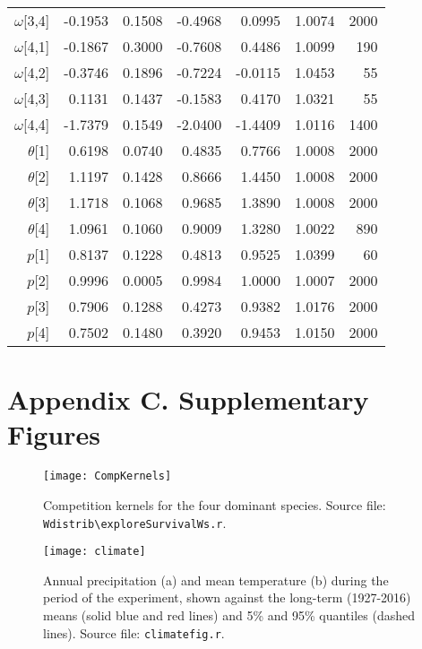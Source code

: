 \documentclass[11pt]{article}
\begin{document}
\begin{table}[ht]
\begin{tabular}{rrrrrrr}
  $\omega$[3,4] & -0.1953 & 0.1508 & -0.4968 & 0.0995 & 1.0074 &  2000 \\ 
  $\omega$[4,1] & -0.1867 & 0.3000 & -0.7608 & 0.4486 & 1.0099 &   190 \\ 
  $\omega$[4,2] & -0.3746 & 0.1896 & -0.7224 & -0.0115 & 1.0453 &    55 \\ 
  $\omega$[4,3] & 0.1131 & 0.1437 & -0.1583 & 0.4170 & 1.0321 &    55 \\ 
  $\omega$[4,4] & -1.7379 & 0.1549 & -2.0400 & -1.4409 & 1.0116 &  1400 \\ 
   $\theta$[1] & 0.6198 & 0.0740 & 0.4835 & 0.7766 & 1.0008 &  2000 \\ 
   $\theta$[2] & 1.1197 & 0.1428 & 0.8666 & 1.4450 & 1.0008 &  2000 \\ 
   $\theta$[3] & 1.1718 & 0.1068 & 0.9685 & 1.3890 & 1.0008 &  2000 \\ 
  $\theta$[4] & 1.0961 & 0.1060 & 0.9009 & 1.3280 & 1.0022 &   890 \\ 
  $p$[1] & 0.8137 & 0.1228 & 0.4813 & 0.9525 & 1.0399 &    60 \\ 
  $p$[2] & 0.9996 & 0.0005 & 0.9984 & 1.0000 & 1.0007 &  2000 \\ 
  $p$[3] & 0.7906 & 0.1288 & 0.4273 & 0.9382 & 1.0176 &  2000 \\ 
  $p$[4] & 0.7502 & 0.1480 & 0.3920 & 0.9453 & 1.0150 &  2000 \\ 
   \hline
\end{tabular}
\end{table}


\clearpage

\renewcommand{\thesection}{C.\arabic{section}}

\section*{Appendix C. Supplementary Figures} 


 \begin{figure}[h]
 \centering
 \texttt{[image: CompKernels]}
 \caption{Competition kernels for the four dominant species. Source file: \texttt{Wdistrib\textbackslash exploreSurvivalWs.r}. }
 \label{fig:CompKernels}
 \end{figure}
 
  \begin{figure}[h]
  \centering
  \texttt{[image: climate]}
  \caption{Annual precipitation (a) and mean temperature (b) during the period of the experiment, shown against the long-term (1927-2016) means (solid blue and red lines) and 5\% and 95\% quantiles (dashed lines). Source file:  \texttt{climate\textunderscore fig.r}.}
  \label{fig:climate}
  \end{figure}
  
\end{document}

